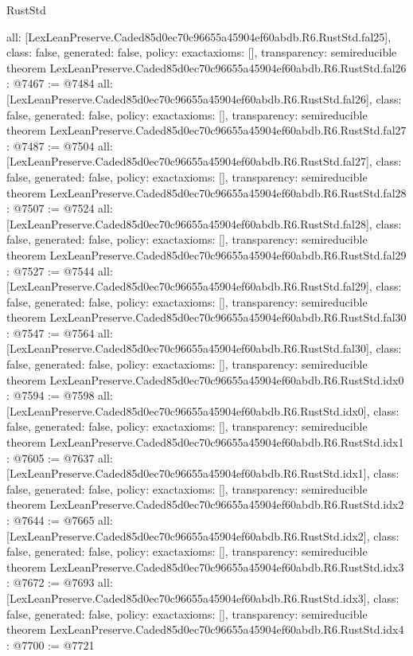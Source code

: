 \begin{lexlean}{RustStd}
\begin{coremodule}
{  all: [LexLeanPreserve.Caded85d0ec70c96655a45904ef60abdb.R6.RustStd.fal25],
  class: false,
  generated: false,
  policy: exact{axioms: []},
  transparency: semireducible
}
theorem LexLeanPreserve.Caded85d0ec70c96655a45904ef60abdb.R6.RustStd.fal26 : @7467 := @7484 {
  all: [LexLeanPreserve.Caded85d0ec70c96655a45904ef60abdb.R6.RustStd.fal26],
  class: false,
  generated: false,
  policy: exact{axioms: []},
  transparency: semireducible
}
theorem LexLeanPreserve.Caded85d0ec70c96655a45904ef60abdb.R6.RustStd.fal27 : @7487 := @7504 {
  all: [LexLeanPreserve.Caded85d0ec70c96655a45904ef60abdb.R6.RustStd.fal27],
  class: false,
  generated: false,
  policy: exact{axioms: []},
  transparency: semireducible
}
theorem LexLeanPreserve.Caded85d0ec70c96655a45904ef60abdb.R6.RustStd.fal28 : @7507 := @7524 {
  all: [LexLeanPreserve.Caded85d0ec70c96655a45904ef60abdb.R6.RustStd.fal28],
  class: false,
  generated: false,
  policy: exact{axioms: []},
  transparency: semireducible
}
theorem LexLeanPreserve.Caded85d0ec70c96655a45904ef60abdb.R6.RustStd.fal29 : @7527 := @7544 {
  all: [LexLeanPreserve.Caded85d0ec70c96655a45904ef60abdb.R6.RustStd.fal29],
  class: false,
  generated: false,
  policy: exact{axioms: []},
  transparency: semireducible
}
theorem LexLeanPreserve.Caded85d0ec70c96655a45904ef60abdb.R6.RustStd.fal30 : @7547 := @7564 {
  all: [LexLeanPreserve.Caded85d0ec70c96655a45904ef60abdb.R6.RustStd.fal30],
  class: false,
  generated: false,
  policy: exact{axioms: []},
  transparency: semireducible
}
theorem LexLeanPreserve.Caded85d0ec70c96655a45904ef60abdb.R6.RustStd.idx0 : @7594 := @7598 {
  all: [LexLeanPreserve.Caded85d0ec70c96655a45904ef60abdb.R6.RustStd.idx0],
  class: false,
  generated: false,
  policy: exact{axioms: []},
  transparency: semireducible
}
theorem LexLeanPreserve.Caded85d0ec70c96655a45904ef60abdb.R6.RustStd.idx1 : @7605 := @7637 {
  all: [LexLeanPreserve.Caded85d0ec70c96655a45904ef60abdb.R6.RustStd.idx1],
  class: false,
  generated: false,
  policy: exact{axioms: []},
  transparency: semireducible
}
theorem LexLeanPreserve.Caded85d0ec70c96655a45904ef60abdb.R6.RustStd.idx2 : @7644 := @7665 {
  all: [LexLeanPreserve.Caded85d0ec70c96655a45904ef60abdb.R6.RustStd.idx2],
  class: false,
  generated: false,
  policy: exact{axioms: []},
  transparency: semireducible
}
theorem LexLeanPreserve.Caded85d0ec70c96655a45904ef60abdb.R6.RustStd.idx3 : @7672 := @7693 {
  all: [LexLeanPreserve.Caded85d0ec70c96655a45904ef60abdb.R6.RustStd.idx3],
  class: false,
  generated: false,
  policy: exact{axioms: []},
  transparency: semireducible
}
theorem LexLeanPreserve.Caded85d0ec70c96655a45904ef60abdb.R6.RustStd.idx4 : @7700 := @7721 {
}
\end{coremodule}
\end{lexlean}
